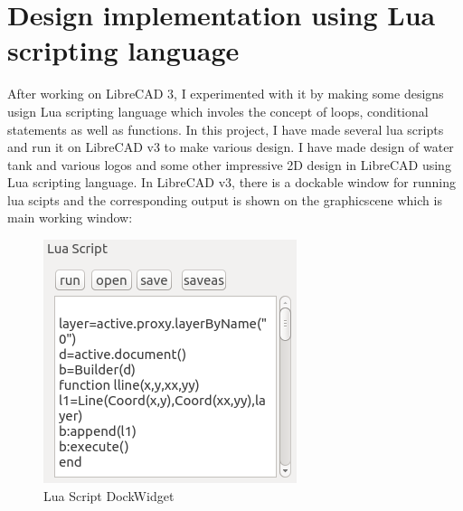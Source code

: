\section{Design implementation using Lua scripting language}
After working on LibreCAD 3, I experimented with it by making some designs usign Lua scripting language which involes the concept of loops, conditional statements as well as functions.
\noindent In this project, I have made several lua scripts and run it on LibreCAD v3 to make various design. I have made design of water tank and various logos and some other impressive 2D design in LibreCAD using Lua scripting language. 
In LibreCAD v3, there is a dockable window for running lua scipts and the corresponding output is shown on the graphicscene which is main working window:
\begin{figure}[!ht]
\centering
\includegraphics[scale=0.6]{images/lualogo/lua.png}                   
\caption{Lua Script DockWidget}
\end{figure}
